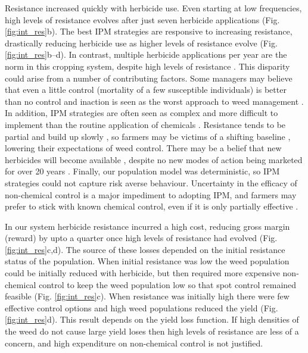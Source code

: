 \documentclass[12pt, a4paper]{article}
\begin{document}
Resistance increased quickly with herbicide use. Even starting at low frequencies, high levels of resistance evolves after just seven herbicide applications (Fig. \ref{fig:int_res}b). The best IPM strategies are responsive to increasing resistance, drastically reducing herbicide use as higher levels of resistance evolve (Fig. \ref{fig:int_res}b--d). In contrast, multiple herbicide applications per year are the norm in this cropping system, despite high levels of resistance \citep{Hick2018}. This disparity could arise from a number of contributing factors. Some managers may believe that even a little control (mortality of a few susceptible individuals) is better than no control and inaction is seen as the worst approach to weed management \citep{Wils2008}. In addition, IPM strategies are often seen as complex and more difficult to implement than the routine application of chemicals \citep{Llew2006}. Resistance tends to be partial and build up slowly \citep{Moss2009, Hull2014}, so farmers may be victims of a shifting baseline \citep{Stee2013}, lowering their expectations of weed control. There may be a belief that new herbicides will become available \citep{Hurl2016}, despite no new modes of action being marketed for over 20 years \citep{Duke2012}. Finally, our population model was deterministic, so IPM strategies could not capture risk averse behaviour. Uncertainty in the efficacy of non-chemical control is a major impediment to adopting IPM, and farmers may prefer to stick with known chemical control, even if it is only partially effective \citep{Hurl2016}.

In our system herbicide resistance incurred a high cost, reducing gross margin (reward) by upto a quarter once high levels of resistance had evolved (Fig. \ref{fig:int_res}c,d). The source of these losses depended on the initial resistance status of the population. When initial resistance was low the weed population could be initially reduced with herbicide, but then required more expensive non-chemical control to keep the weed population low so that spot control remained feasible (Fig. \ref{fig:int_res}c). When resistance was initially high there were few effective control options and high weed populations reduced the yield (Fig. \ref{fig:int_res}d). This result depends on the yield loss function. If high densities of the weed do not cause large yield loses then high levels of resistance are less of a concern, and high expenditure on non-chemical control is not justified.           
\end{document}
